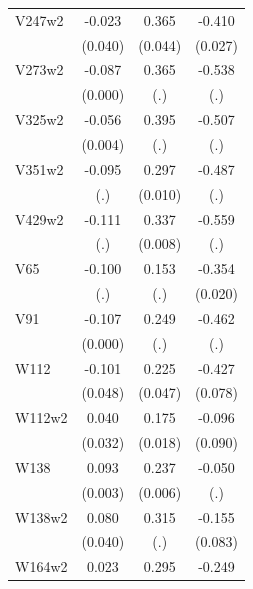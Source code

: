 \begin{table}[htbp]
\begin{tabular}{l*{3}{c}}
V247w2          &   -0.023         &    0.365\sym{***}&   -0.410\sym{***}\\
                &  (0.040)         &  (0.044)         &  (0.027)         \\
V273w2          &   -0.087\sym{***}&    0.365         &   -0.538         \\
                &  (0.000)         &      (.)         &      (.)         \\
V325w2          &   -0.056\sym{***}&    0.395         &   -0.507         \\
                &  (0.004)         &      (.)         &      (.)         \\
V351w2          &   -0.095         &    0.297\sym{***}&   -0.487         \\
                &      (.)         &  (0.010)         &      (.)         \\
V429w2          &   -0.111         &    0.337\sym{***}&   -0.559         \\
                &      (.)         &  (0.008)         &      (.)         \\
V65             &   -0.100         &    0.153         &   -0.354\sym{***}\\
                &      (.)         &      (.)         &  (0.020)         \\
V91             &   -0.107\sym{***}&    0.249         &   -0.462         \\
                &  (0.000)         &      (.)         &      (.)         \\
W112            &   -0.101\sym{**} &    0.225\sym{***}&   -0.427\sym{***}\\
                &  (0.048)         &  (0.047)         &  (0.078)         \\
W112w2          &    0.040         &    0.175\sym{***}&   -0.096         \\
                &  (0.032)         &  (0.018)         &  (0.090)         \\
W138            &    0.093\sym{***}&    0.237\sym{***}&   -0.050         \\
                &  (0.003)         &  (0.006)         &      (.)         \\
W138w2          &    0.080\sym{**} &    0.315         &   -0.155\sym{*}  \\
                &  (0.040)         &      (.)         &  (0.083)         \\
W164w2          &    0.023         &    0.295\sym{***}&   -0.249\sym{***}\\

\end{tabular}
\end{table}
